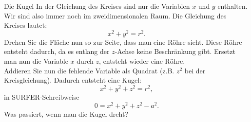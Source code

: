 \begin{surferPage}[Kugel]{Die Kugel}
In der Gleichung des Kreises sind nur die Variablen $x$ und $y$ enthalten. Wir sind also immer noch im zweidimensionalen Raum. 
Die Gleichung des Kreises lautet:
\[x^2+y^2=r^2.\]
Drehen Sie die Fläche nun so zur Seite, dass man eine Röhre sieht. Diese Röhre entsteht dadurch, da es entlang der $z$-Achse keine Beschränkung gibt. Ersetzt man nun die Variable $x$ durch $z$, entsteht wieder eine Röhre.\\
Addieren Sie nun die fehlende Variable als Quadrat (z.B. $z^2$ bei der Kreisgleichung). 
Dadurch entsteht eine Kugel:
\[x^2+y^2+z^2=r^2,\]
in SURFER-Schreibweise
\[0=x^2+y^2+z^2-a^2.\]
Was passiert, wenn man die Kugel dreht?
\end{surferPage}
